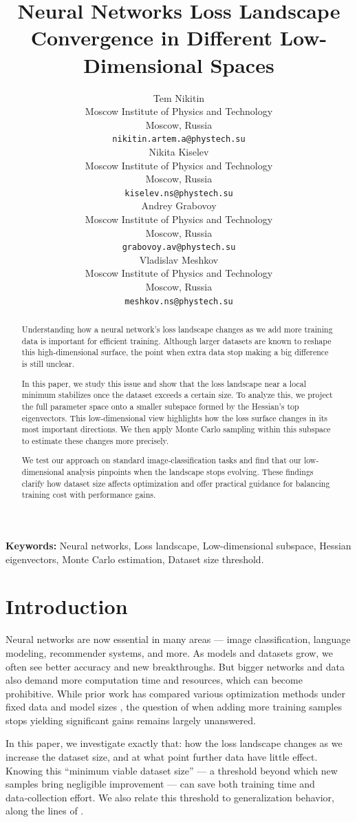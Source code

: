 \documentclass{article}
\title{Neural Networks Loss Landscape Convergence in Different Low-Dimensional Spaces}
\author{
  Tem Nikitin\\
  Moscow Institute of Physics and Technology\\
  Moscow, Russia\\
  \texttt{nikitin.artem.a@phystech.su}\\
  \And
  Nikita Kiselev\\
  Moscow Institute of Physics and Technology\\
  Moscow, Russia\\
  \texttt{kiselev.ns@phystech.su}\\
  \And
  Andrey Grabovoy\\
  Moscow Institute of Physics and Technology\\
  Moscow, Russia\\
  \texttt{grabovoy.av@phystech.su}\\
  \And
  Vladislav Meshkov\\
  Moscow Institute of Physics and Technology\\
  Moscow, Russia\\
  \texttt{meshkov.ns@phystech.su}\\
}
\begin{document}
\maketitle


\begin{abstract}
  Understanding how a neural network’s loss landscape changes as we add more training data is important for efficient training.
  Although larger datasets are known to reshape this high-dimensional surface, the point when extra data stop making a big difference
  is still unclear.

  In this paper, we study this issue and show that the loss landscape near a local minimum stabilizes once the dataset exceeds a
  certain size. To analyze this, we project the full parameter space onto a smaller subspace formed by the Hessian’s top eigenvectors.
  This low-dimensional view highlights how the loss surface changes in its most important directions. We then apply Monte Carlo sampling
  within this subspace to estimate these changes more precisely.

  We test our approach on standard image‑classification tasks and find that our low-dimensional analysis pinpoints when the landscape
  stops evolving. These findings clarify how dataset size affects optimization and offer practical guidance for balancing training cost
  with performance gains.
\end{abstract}


\textbf{Keywords:}
Neural networks, Loss landscape, Low-dimensional subspace, Hessian eigenvectors, Monte Carlo estimation, Dataset size threshold.


\section{Introduction}\label{sec:intro}

Neural networks are now essential in many areas --- image classification, language modeling, recommender systems, and more. As models and
datasets grow, we often see better accuracy and new breakthroughs. But bigger networks and data also demand more computation time and
resources, which can become prohibitive. While prior work has compared various optimization methods under fixed data and model sizes
\cite{soydaner2020comparison}, the question of when adding more training samples stops yielding significant gains remains largely
unanswered.

In this paper, we investigate exactly that: how the loss landscape changes as we increase the dataset size, and at what point further
data have little effect. Knowing this “minimum viable dataset size” --- a threshold beyond which new samples bring negligible
improvement --- can save both training time and data‑collection effort. We also relate this threshold to generalization behavior, along
the lines of \cite{wu2017towards}.
\end{document}
